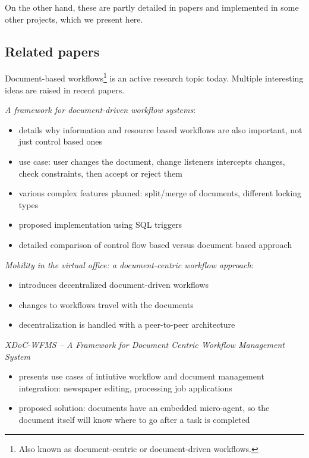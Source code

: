 On the other hand, these are partly detailed in papers and implemented in some
other projects, which we present here.

\subsection*{Related papers}

Document-based workflows\footnote{Also known as document-centric or
document-driven workflows.} is an active research topic today. Multiple
interesting ideas are raised in recent papers.

\emph{A framework for document-driven workflow systems}\cite{paper-framework}:
\begin{itemize}
\item details why information and resource based workflows are also important, not just control based ones
\item use case: user changes the document, change listeners intercepts changes, check constraints, then accept or reject them
\item various complex features planned: split/merge of documents, different locking types
\item proposed implementation using SQL triggers
\item detailed comparison of control flow based versus document based approach
\end{itemize}

\emph{Mobility in the virtual office: a document-centric workflow approach}\cite{paper-mobility}:
\begin{itemize}
\item introduces decentralized document-driven workflows
\item changes to workflows travel with the documents
\item decentralization is handled with a peer-to-peer architecture
\end{itemize}

\emph{XDoC-WFMS -- A Framework for Document Centric Workflow Management System}\cite{paper-xdoc}
\begin{itemize}
\item presents use cases of intiutive workflow and document management integration: newspaper editing, processing job applications
\item proposed solution: documents have an embedded micro-agent, so the document itself will know where to go after a task is completed
\end{itemize}

